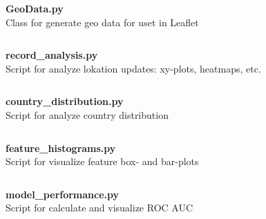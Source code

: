 \textbf{\Large GeoData.py}\\

Class for generate geo data for uset in Leaflet
\inputminted[mathescape,
               linenos,
               numbersep=5pt,
               gobble=2,
               frame=lines,
               framesep=2mm]{python}{../tools/GeoData.py}

\textbf{\Large record\_analysis.py}\\

Script for analyze lokation updates: xy-plots, heatmaps, etc.
\inputminted[mathescape,
               linenos,
               numbersep=5pt,
               gobble=2,
               frame=lines,
               framesep=2mm]{python}{../tools/scripts/records_analysis.py}

\textbf{\Large country\_distribution.py}\\

Script for analyze country distribution
\inputminted[mathescape,
               linenos,
               numbersep=5pt,
               gobble=2,
               frame=lines,
               framesep=2mm]{python}{../tools/scripts/country_distribution.py}

\textbf{\Large feature\_histograms.py}\\

Script for visualize feature box- and bar-plots
\inputminted[mathescape,
               linenos,
               numbersep=5pt,
               gobble=2,
               frame=lines,
               framesep=2mm]{python}{../tools/scripts/feature_histograms.py}

\textbf{\Large model\_performance.py}\\

Script for calculate and visualize ROC AUC
\inputminted[mathescape,
               linenos,
               numbersep=5pt,
               gobble=2,
               frame=lines,
               framesep=2mm]{python}{../tools/scripts/model_performance.py}